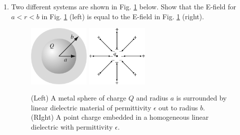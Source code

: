 \documentclass[10pt]{article}
\begin{document}
\begin{enumerate}
\item Two different systems are shown in Fig. \ref{fig:shield} below.  Show that the E-field for $a < r < b$ in Fig. \ref{fig:shield} (left) is equal to the E-field in Fig. \ref{fig:shield} (right).
\begin{figure}
\centering
\includegraphics[width=3cm]{4_20.jpg} \hspace{2cm}
\includegraphics[width=3cm]{4_22.jpg}
\caption{\label{fig:shield} (Left) A metal sphere of charge $Q$ and radius $a$ is surrounded by linear dielectric material of permittivity $\epsilon$ out to radius $b$.  (RIght) A point charge embedded in a homogeneous linear dielectric with permittivity $\epsilon$.}
\end{figure}
\end{enumerate}
\end{document}
